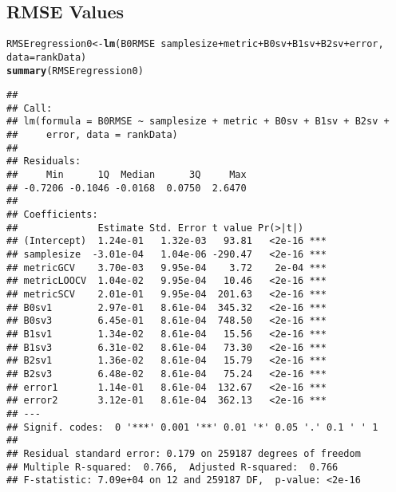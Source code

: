 \documentclass{article}\usepackage[]{graphicx}\usepackage[]{color}
\makeatletter
\newcommand{\hlopt}[1]{\textcolor[rgb]{0,0,0}{#1}}%
\newcommand{\hlstd}[1]{\textcolor[rgb]{0.345,0.345,0.345}{#1}}%
\newcommand{\hlkwb}[1]{\textcolor[rgb]{0.69,0.353,0.396}{#1}}%
\newcommand{\hlkwc}[1]{\textcolor[rgb]{0.333,0.667,0.333}{#1}}%
\newcommand{\hlkwd}[1]{\textcolor[rgb]{0.737,0.353,0.396}{\textbf{#1}}}%
\newenvironment{kframe}{%
 \def\at@end@of@kframe{}%
 \ifinner\ifhmode%
  \def\at@end@of@kframe{\end{minipage}}%
  \begin{minipage}{\columnwidth}%
 \fi\fi%
 \def\FrameCommand##1{\hskip\@totalleftmargin \hskip-\fboxsep
 \colorbox{shadecolor}{##1}\hskip-\fboxsep
     \hskip-\linewidth \hskip-\@totalleftmargin \hskip\columnwidth}%
 \MakeFramed {\advance\hsize-\width
   \@totalleftmargin\z@ \linewidth\hsize
   \@setminipage}}%
 {\par\unskip\endMakeFramed%
 \at@end@of@kframe}
\newenvironment{knitrout}{}{} %
\makeatother
\begin{document}
\subsection{RMSE Values}

\begin{knitrout}
\color{fgcolor}\begin{kframe}
\begin{alltt}
\hlstd{RMSEregression0} \hlkwb{<-} \hlkwd{lm}\hlstd{(B0RMSE} \hlopt{~} \hlstd{samplesize} \hlopt{+} \hlstd{metric} \hlopt{+} \hlstd{B0sv} \hlopt{+} \hlstd{B1sv} \hlopt{+} \hlstd{B2sv} \hlopt{+} \hlstd{error,}
    \hlkwc{data} \hlstd{= rankData)}
\hlkwd{summary}\hlstd{(RMSEregression0)}
\end{alltt}
\begin{verbatim}
## 
## Call:
## lm(formula = B0RMSE ~ samplesize + metric + B0sv + B1sv + B2sv + 
##     error, data = rankData)
## 
## Residuals:
##     Min      1Q  Median      3Q     Max 
## -0.7206 -0.1046 -0.0168  0.0750  2.6470 
## 
## Coefficients:
##              Estimate Std. Error t value Pr(>|t|)    
## (Intercept)  1.24e-01   1.32e-03   93.81   <2e-16 ***
## samplesize  -3.01e-04   1.04e-06 -290.47   <2e-16 ***
## metricGCV    3.70e-03   9.95e-04    3.72    2e-04 ***
## metricLOOCV  1.04e-02   9.95e-04   10.46   <2e-16 ***
## metricSCV    2.01e-01   9.95e-04  201.63   <2e-16 ***
## B0sv1        2.97e-01   8.61e-04  345.32   <2e-16 ***
## B0sv3        6.45e-01   8.61e-04  748.50   <2e-16 ***
## B1sv1        1.34e-02   8.61e-04   15.56   <2e-16 ***
## B1sv3        6.31e-02   8.61e-04   73.30   <2e-16 ***
## B2sv1        1.36e-02   8.61e-04   15.79   <2e-16 ***
## B2sv3        6.48e-02   8.61e-04   75.24   <2e-16 ***
## error1       1.14e-01   8.61e-04  132.67   <2e-16 ***
## error2       3.12e-01   8.61e-04  362.13   <2e-16 ***
## ---
## Signif. codes:  0 '***' 0.001 '**' 0.01 '*' 0.05 '.' 0.1 ' ' 1
## 
## Residual standard error: 0.179 on 259187 degrees of freedom
## Multiple R-squared:  0.766,	Adjusted R-squared:  0.766 
## F-statistic: 7.09e+04 on 12 and 259187 DF,  p-value: <2e-16
\end{verbatim}
\end{kframe}
\end{knitrout}
\end{document}
